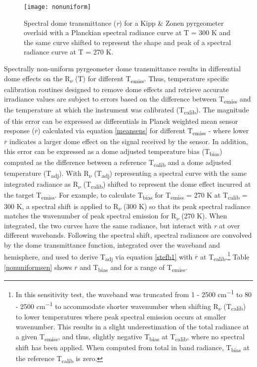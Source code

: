 \begin{figure}[H]
	\centering
	\texttt{[image: nonuniform]}
	\caption{Spectral dome transmittance (\textit{r}) for a Kipp \& Zonen pyrgeometer overlaid with a Planckian spectral radiance curve at T = 300 \si{\kelvin} and the same curve shifted to represent the shape and peak of a spectral radiance curve at T = 270 \si{\kelvin}.}
	\label{nonuniform}
\end{figure}

Spectrally non-uniform pyrgeometer dome transmittance results in differential dome effects on the R\textsubscript{$\nu$} (T) for different T\textsubscript{emiss}. Thus, temperature specific calibration routines designed to remove dome effects and retrieve accurate irradiance values are subject to errors based on the difference between T\textsubscript{emiss} and the temperature at which the instrument was calibrated (T\textsubscript{calib}). The magnitude of this error can be expressed as differentials in Planck weighted mean sensor response ($\overline{r} $) calculated via equation \ref{meansens} for different T\textsubscript{emiss} - where lower $\overline{r} $ indicates a larger dome effect on the signal received by the sensor. In addition, this error can be expressed as a dome adjusted temperature bias (T\textsubscript{bias}) computed as the difference between a reference T\textsubscript{calib} and a dome adjusted temperature (T\textsubscript{adj}). With R\textsubscript{$\nu$} (T\textsubscript{adj}) representing a spectral curve with the same integrated radiance as R\textsubscript{$\nu$} (T\textsubscript{calib}) shifted to represent the dome effect incurred at the target T\textsubscript{emiss}. For example, to calculate T\textsubscript{bias} for T\textsubscript{emiss} = 270 \si{\kelvin} at T\textsubscript{calib} = 300 \si{\kelvin}, a spectral shift is applied to R\textsubscript{$\nu$} (300 \si{\kelvin}) so that its peak spectral radiance matches the wavenumber of peak spectral emission for R\textsubscript{$\nu$} (270 \si{\kelvin}). When integrated, the two curves have the same radiance, but interact with \textit{r} at over different wavebands. Following the spectral shift, spectral radiances are convolved by the dome transmittance function, integrated over the waveband and hemisphere, and used to derive T\textsubscript{adj} via equation \ref{stefb1} with $\overline{r}$ at T\textsubscript{calib}.\footnote{In this sensitivity test, the waveband was truncated from 1 - 2500 \si{cm^{-1}} to 80 - 2500 \si{cm^{-1}} to accommodate shorter wavenumber when shifting R\textsubscript{$\nu$} (T\textsubscript{calib}) to lower temperatures where peak spectral emission occurs at smaller wavenumber. This results in a slight underestimation of the total radiance at a given T\textsubscript{emiss}, and thus, slightly negative T\textsubscript{bias} at T\textsubscript{calib}, where no spectral shift has been applied. When computed from total in band radiance, T\textsubscript{bias} at the reference T\textsubscript{calib} is zero.} Table \ref{nonuniformsen} shows $\overline{r}$ and T\textsubscript{bias} and for a range of T\textsubscript{emiss}.

